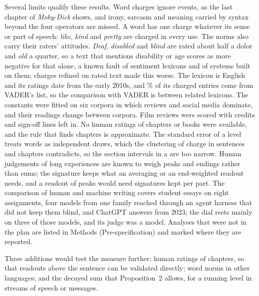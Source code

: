 Several limits qualify these results. Word charges ignore events, as the last chapter of \emph{Moby-Dick} shows, and irony, sarcasm and meaning carried by syntax beyond the four operators are missed. A word has one charge whatever its sense or part of speech: \emph{like}, \emph{kind} and \emph{pretty} are charged in every use. The norms also carry their raters' attitudes. \emph{Deaf}, \emph{disabled} and \emph{blind} are rated about half a dolor and \emph{old} a quarter, so a text that mentions disability or age scores as more negative for that alone, a known fault of sentiment lexicons and of systems built on them\cite{diaz2018,kiritchenko2018}; charges refined on rated text made this worse. The lexicon is English and its ratings date from the early 2010s, and \lexFromVader\% of its charged entries come from VADER's list, so the comparison with VADER is between related lexicons. The constants were fitted on six corpora in which reviews and social media dominate, and their readings change between corpora. Film reviews were scored with credits and sign-off lines left in. No human ratings of chapters or books were available, and the rule that finds chapters is approximate. The standard error of a level treats words as independent draws, which the clustering of charge in sentences and chapters contradicts, so the section intervals in a are too narrow. Human judgements of long experiences are known to weigh peaks and endings rather than sums\cite{fredrickson1993}; the signature keeps what an averaging or an end-weighted readout needs, and a readout of peaks would need signatures kept per part. The comparison of human and machine writing covers \esN{} student essays on eight assignments, four models from one family reached through an agent harness that did not keep them blind, and ChatGPT answers from 2023; the dial rests mainly on three of those models, and its judge was a model. Analyses that were not in the plan are listed in Methods (Pre-specification) and marked where they are reported.

Three additions would test the measure further: human ratings of chapters, so that readouts above the sentence can be validated directly; word norms in other languages; and the decayed sum that Proposition~2 allows, for a running level in streams of speech or messages.
